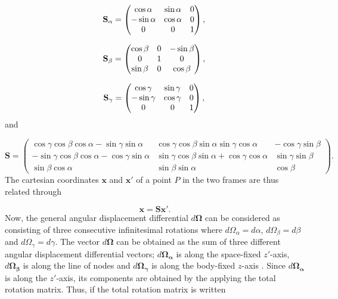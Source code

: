\begin{equation}
\mathbf{S}_{\alpha}=
\begin{pmatrix}
\cos\alpha & \sin\alpha  & 0\\
-\sin\alpha & \cos\alpha & 0\\
0            & 0            & 1
\end{pmatrix},\\
\end{equation}

\begin{equation}
\mathbf{S}_{\beta}=
\begin{pmatrix}
\cos\beta & 0  & -\sin\beta\\
0 & 1 & 0\\
\sin\beta & 0  & \cos\beta
\end{pmatrix},\\
\end{equation}

\begin{equation}
\mathbf{S}_{\gamma}=
\begin{pmatrix}
\cos\gamma & \sin\gamma  & 0\\
-\sin\gamma & \cos\gamma & 0\\
0            & 0            & 1
\end{pmatrix},\\
\end{equation}
and

\begin{equation}
\mathbf{S}=
\begin{pmatrix}
\cos\gamma \cos\beta \cos\alpha -\sin\gamma \sin\alpha & \cos\gamma \cos\beta \sin\alpha \sin\gamma \cos\alpha  & -\cos\gamma \sin\beta\\
-\sin\gamma \cos\beta \cos\alpha -\cos\gamma \sin\alpha & \sin\gamma \cos\beta \sin\alpha +\cos\gamma \cos\alpha & \sin\gamma \sin\beta\\
\sin\beta \cos\alpha & \sin\beta \sin\alpha & \cos\beta
\end{pmatrix}.
\end{equation}
The cartesian coordinates $\mathbf{x}$ and $\mathbf{x}'$ of a point $P$ in the two frames are thus related through

\begin{equation}
\mathbf{x} = \mathbf{S}\mathbf{x}'. 
\end{equation}
Now, the general angular displacement differential  $d\mathbf{\Omega}$ can be considered as consisting of three consecutive infinitesimal rotations where $d\Omega_{\alpha} = d\alpha$, $d\Omega_{\beta} = d\beta$ and $d\Omega_{\gamma} = d\gamma$. The vector $d\mathbf{\Omega}$ can be obtained as the sum of three different angular displacement differential vectors; $d\mathbf{\Omega_{\alpha}}$ is along the space-fixed $z'$-axis, $d\mathbf{\Omega_{\beta}}$ is along the line of nodes and $d\mathbf{\Omega_{\gamma}}$ is along the body-fixed $z$-axis \cite{goldstein_poole_safko_2000}. Since $d\mathbf{\Omega_{\alpha}}$ is along the $z'$-axis, its components are obtained by the applying the total rotation matrix. Thus, if the total rotation matrix is written

